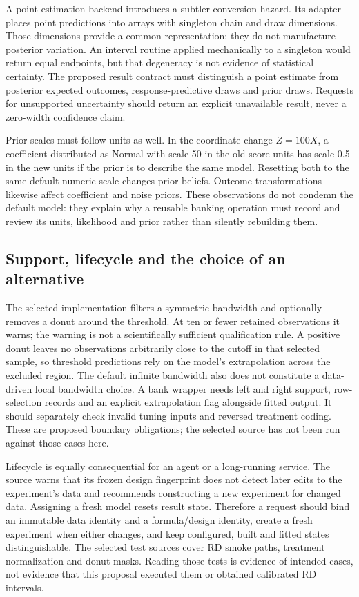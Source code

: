 A point-estimation backend introduces a subtler conversion hazard. Its adapter
places point predictions into arrays with singleton chain and draw dimensions.
Those dimensions provide a common representation; they do not manufacture
posterior variation. An interval routine applied mechanically to a singleton
would return equal endpoints, but that degeneracy is not evidence of statistical
certainty. The proposed result contract must distinguish a point estimate from
posterior expected outcomes, response-predictive draws and prior draws. Requests
for unsupported uncertainty should return an explicit unavailable result, never
a zero-width confidence claim.~\citep{exec14_causalpy_primary,exec14_causalpy_decision}

Prior scales must follow units as well. In the coordinate change $Z=100X$, a
coefficient distributed as Normal with scale 50 in the old score units has scale
0.5 in the new units if the prior is to describe the same model. Resetting both
to the same default numeric scale changes prior beliefs. Outcome transformations
likewise affect coefficient and noise priors. These observations do not condemn
the default model: they explain why a reusable banking operation must record and
review its units, likelihood and prior rather than silently rebuilding them.
\citep{exec14_causalpy_primary,exec14_causalpy_exact}

\subsection{Support, lifecycle and the choice of an alternative}

The selected implementation filters a symmetric bandwidth and optionally removes
a donut around the threshold. At ten or fewer retained observations it warns;
the warning is not a scientifically sufficient qualification rule. A positive
donut leaves no observations arbitrarily close to the cutoff in that selected
sample, so threshold predictions rely on the model's extrapolation across the
excluded region. The default infinite bandwidth also does not constitute a
data-driven local bandwidth choice. A bank wrapper needs left and right support,
row-selection records and an explicit extrapolation flag alongside fitted output.
It should separately check invalid tuning inputs and reversed treatment coding.
These are proposed boundary obligations; the selected source has not been run
against those cases here.~\citep{exec14_causalpy_primary,exec14_causalpy_decision}

Lifecycle is equally consequential for an agent or a long-running service. The
source warns that its frozen design fingerprint does not detect later edits to
the experiment's data and recommends constructing a new experiment for changed
data. Assigning a fresh model resets result state. Therefore a request should bind
an immutable data identity and a formula/design identity, create a fresh experiment
when either changes, and keep configured, built and fitted states distinguishable.
The selected test sources cover RD smoke paths, treatment normalization and donut
masks. Reading those tests is evidence of intended cases, not evidence that this
proposal executed them or obtained calibrated RD intervals.
\citep{exec14_causalpy_primary}

